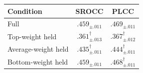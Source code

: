 \begin{tabular}{l cc}
\toprule
Condition & SROCC & PLCC \\
\midrule
Full & $\bm{.459_{\pm .011}}$ & $\bm{.469_{\pm .011}}$ \\
Top-weight held & $.361_{\pm .013}^{\dagger}$ & $.367_{\pm .012}^{\dagger}$ \\
Average-weight held & $.435_{\pm .011}^{\dagger}$ & $.444_{\pm .011}^{\dagger}$ \\
Bottom-weight held & $.459_{\pm .011}$ & $.468_{\pm .011}^{\dagger}$ \\
\bottomrule
\end{tabular}


